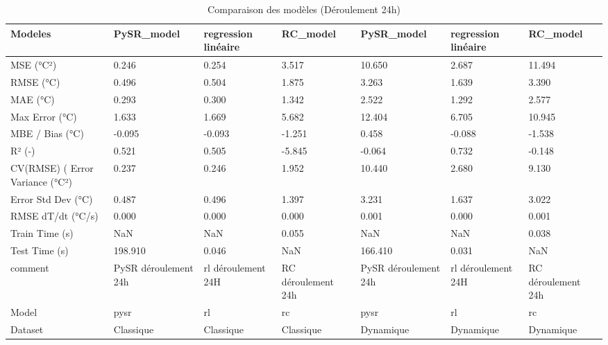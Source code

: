 \begin{table}
\caption{Comparaison des modèles (Déroulement 24h)}
\label{tab:tableau_24h}
\begin{tabular}{lllllll}
\toprule
Modeles & PySR_model & regression linéaire & RC_model & PySR_model & regression linéaire & RC_model \\
\midrule
MSE (°C²) & 0.246 & 0.254 & 3.517 & 10.650 & 2.687 & 11.494 \\
RMSE (°C) & 0.496 & 0.504 & 1.875 & 3.263 & 1.639 & 3.390 \\
MAE (°C) & 0.293 & 0.300 & 1.342 & 2.522 & 1.292 & 2.577 \\
Max Error (°C) & 1.633 & 1.669 & 5.682 & 12.404 & 6.705 & 10.945 \\
MBE / Bias (°C) & -0.095 & -0.093 & -1.251 & 0.458 & -0.088 & -1.538 \\
R² (-) & 0.521 & 0.505 & -5.845 & -0.064 & 0.732 & -0.148 \\
CV(RMSE) (%
Error Variance (°C²) & 0.237 & 0.246 & 1.952 & 10.440 & 2.680 & 9.130 \\
Error Std Dev (°C) & 0.487 & 0.496 & 1.397 & 3.231 & 1.637 & 3.022 \\
RMSE dT/dt (°C/s) & 0.000 & 0.000 & 0.000 & 0.001 & 0.000 & 0.001 \\
Train Time (s) & NaN & NaN & 0.055 & NaN & NaN & 0.038 \\
Test Time (s) & 198.910 & 0.046 & NaN & 166.410 & 0.031 & NaN \\
comment & PySR déroulement 24h & rl déroulement 24H & RC déroulement 24h & PySR déroulement 24h & rl déroulement 24H & RC déroulement 24h \\
Model & pysr & rl & rc & pysr & rl & rc \\
Dataset & Classique & Classique & Classique & Dynamique & Dynamique & Dynamique \\
\bottomrule
\end{tabular}
\end{table}
